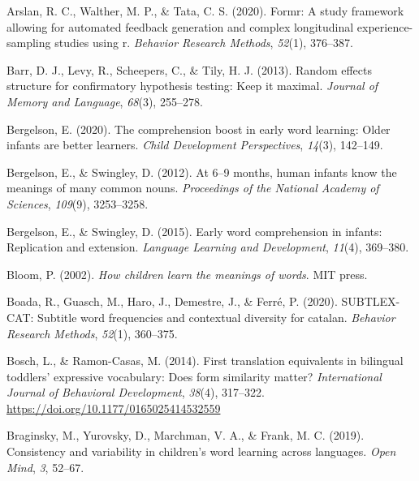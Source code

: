 \documentclass[
  letterpaper,
  DIV=11,
  numbers=noendperiod]{scrartcl}
\newlength{\cslhangindent}
\newlength{\cslentryspacingunit} %
\newenvironment{CSLReferences}[2] %
 {%
  \setlength{\parindent}{0pt}
  \ifodd #1
  \let\oldpar\par
  \def\par{\hangindent=\cslhangindent\oldpar}
  \fi
  \setlength{\parskip}{#2\cslentryspacingunit}
 }%
 {}
\begin{document}
\hypertarget{refs}{}
\begin{CSLReferences}{1}{0}
\leavevmode{}%
Arslan, R. C., Walther, M. P., \& Tata, C. S. (2020). Formr: A study
framework allowing for automated feedback generation and complex
longitudinal experience-sampling studies using r. \emph{Behavior
Research Methods}, \emph{52}(1), 376--387.

\leavevmode{}%
Barr, D. J., Levy, R., Scheepers, C., \& Tily, H. J. (2013). Random
effects structure for confirmatory hypothesis testing: Keep it maximal.
\emph{Journal of Memory and Language}, \emph{68}(3), 255--278.

\leavevmode{}%
Bergelson, E. (2020). The comprehension boost in early word learning:
Older infants are better learners. \emph{Child Development
Perspectives}, \emph{14}(3), 142--149.

\leavevmode{}%
Bergelson, E., \& Swingley, D. (2012). At 6--9 months, human infants
know the meanings of many common nouns. \emph{Proceedings of the
National Academy of Sciences}, \emph{109}(9), 3253--3258.

\leavevmode{}%
Bergelson, E., \& Swingley, D. (2015). Early word comprehension in
infants: Replication and extension. \emph{Language Learning and
Development}, \emph{11}(4), 369--380.

\leavevmode{}%
Bloom, P. (2002). \emph{How children learn the meanings of words}. MIT
press.

\leavevmode{}%
Boada, R., Guasch, M., Haro, J., Demestre, J., \& Ferré, P. (2020).
SUBTLEX-CAT: Subtitle word frequencies and contextual diversity for
catalan. \emph{Behavior Research Methods}, \emph{52}(1), 360--375.

\leavevmode{}%
Bosch, L., \& Ramon-Casas, M. (2014). First translation equivalents in
bilingual toddlers' expressive vocabulary: {Does} form similarity
matter? \emph{International Journal of Behavioral Development},
\emph{38}(4), 317--322. \url{https://doi.org/10.1177/0165025414532559}

\leavevmode{}%
Braginsky, M., Yurovsky, D., Marchman, V. A., \& Frank, M. C. (2019).
Consistency and variability in children's word learning across
languages. \emph{Open Mind}, \emph{3}, 52--67.


\end{CSLReferences}
\end{document}

